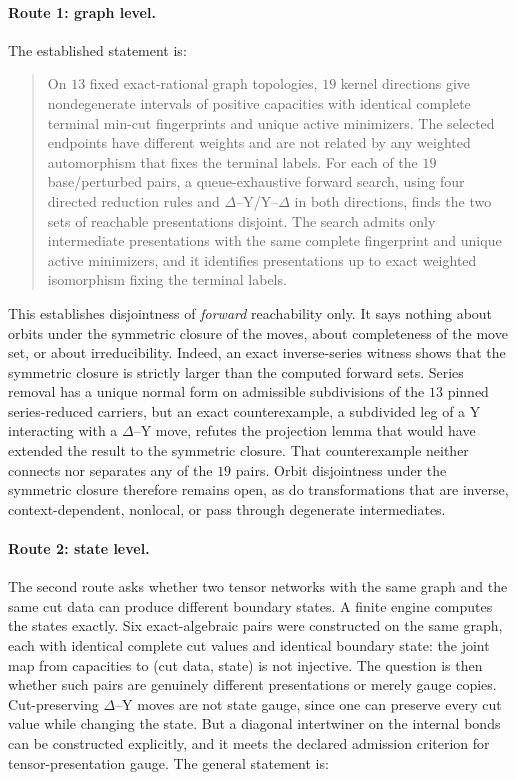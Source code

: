 \documentclass[11pt]{article}
\theoremstyle{definition}
\begin{document}
\paragraph{Route 1: graph level.} The established statement is:

\begin{quote}
On \(13\) fixed exact-rational graph topologies, \(19\) kernel directions give nondegenerate intervals of positive
capacities with identical complete terminal min-cut fingerprints and unique active minimizers. The selected endpoints
have different weights and are not related by any weighted automorphism that fixes the terminal labels. For each of the
\(19\) base/perturbed pairs, a queue-exhaustive forward search, using four directed reduction rules and
\(\Delta\)--Y/Y--\(\Delta\) in both directions, finds the two sets of reachable presentations disjoint. The search
admits only intermediate presentations with the same complete fingerprint and unique active minimizers, and it
identifies presentations up to exact weighted isomorphism fixing the terminal labels.
\end{quote}

This establishes disjointness of \emph{forward} reachability only. It says nothing about orbits under the symmetric
closure of the moves, about completeness of the move set, or about irreducibility. Indeed, an exact inverse-series
witness shows that the symmetric closure is strictly larger than the computed forward sets. Series removal has a unique
normal form on admissible subdivisions of the \(13\) pinned series-reduced carriers, but an exact counterexample, a
subdivided leg of a Y interacting with a \(\Delta\)--Y move, refutes the projection lemma that would have extended the
result to the symmetric closure. That counterexample neither connects nor separates any of the \(19\) pairs. Orbit
disjointness under the symmetric closure therefore remains open, as do transformations that are inverse,
context-dependent, nonlocal, or pass through degenerate intermediates.

\paragraph{Route 2: state level.} The second route asks whether two tensor networks with the same graph and the same
cut data can produce different boundary states. A finite engine computes the states exactly. Six exact-algebraic pairs
were constructed on the same graph, each with identical complete cut values and identical boundary state: the joint
map from capacities to (cut data, state) is not injective. The question is then whether such pairs are genuinely
different presentations or merely gauge copies. Cut-preserving \(\Delta\)--Y moves are not state gauge, since one can
preserve every cut value while changing the state. But a diagonal intertwiner on the internal bonds can be constructed
explicitly, and it meets the declared admission criterion for tensor-presentation gauge. The general statement is:
\end{document}
